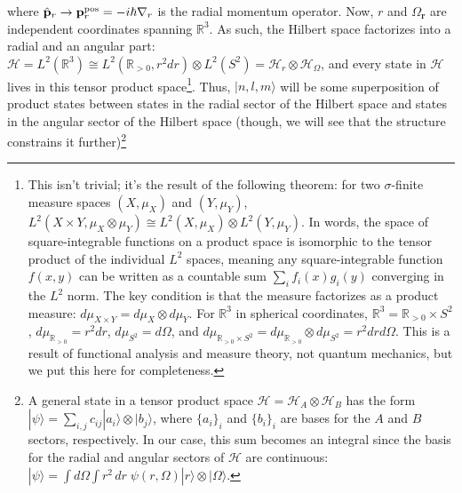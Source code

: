 where $\hat{\mathbf{p}}_r\rightarrow\mathbf{p}_r^\text{pos}=-i\hbar\nabla_r$ is the radial momentum operator. Now, $r$ and $\Omega_{\mathbf{r}}$ are independent coordinates spanning $\mathbb{R}^3$. As such, the Hilbert space factorizes into a radial and an angular part: $\mathcal{H}=L^2(\mathbb{R}^3)\cong L^2(\mathbb{R}_{>0},r^2dr)\otimes L^2(S^2)=\mathcal{H}_r\otimes\mathcal{H}_\Omega$, and every state in $\mathcal{H}$ lives in this tensor product space\footnote{
This isn't trivial; it's the result of the following theorem: for two $\sigma$-finite measure spaces $(X, \mu_X)$ and $(Y, \mu_Y)$, $L^2(X\times Y, \mu_X\otimes \mu_Y)\cong L^2(X,\mu_X)\otimes L^2(Y, \mu_Y)$. In words, the space of square-integrable functions on a product space is isomorphic to the tensor product of the individual $L^2$ spaces, meaning any square-integrable function $f(x,y)$ can be written as a countable sum $\sum_i f_i(x)g_i(y)$ converging in the $L^2$ norm. The key condition is that the measure factorizes as a product measure: $d\mu_{X\times Y}=d\mu_X\otimes d\mu_Y$. For $\mathbb{R}^3$ in spherical coordinates, $\mathbb{R}^3=\mathbb{R}_{>0}\times S^2$, $d\mu_{\mathbb{R}_{>0}}=r^2dr$, $d\mu_{S^2}=d\Omega$, and $d\mu_{\mathbb{R}_{>0}\times S^2}=d\mu_{\mathbb{R}_{>0}}\otimes d\mu_{S^2}=r^2drd\Omega$. This is a result of functional analysis and measure theory, not quantum mechanics, but we put this here for completeness.
}. Thus, $|n,l,m\rangle$ will be some superposition of product states between states in the radial sector of the Hilbert space and states in the angular sector of the Hilbert space (though, we will see that the structure constrains it further)\footnote{A general state in a tensor product space $\mathcal{H}=\mathcal{H}_A\otimes\mathcal{H}_B$ has the form $|\psi\rangle=\sum_{i,j}c_{ij}|a_i\rangle\otimes |b_j\rangle$, where $\{a_i\}_i$ and $\{b_i\}_i$ are bases for the $A$ and $B$ sectors, respectively. In our case, this sum becomes an integral since the basis for the radial and angular sectors of $\mathcal{H}$ are continuous: $|\psi\rangle=\int d\Omega\int r^2\,dr\; \psi(r, \Omega)|r\rangle\otimes|\Omega\rangle$.
}
